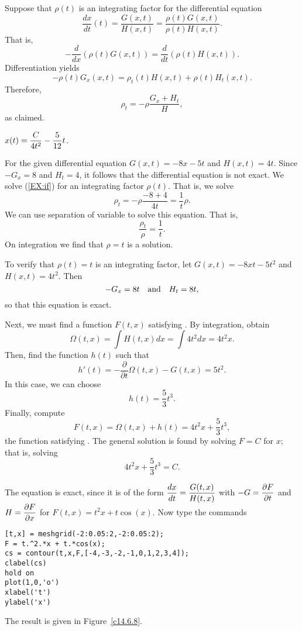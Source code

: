 \documentclass{ximera}
\begin{document}
Suppose that $\rho(t)$ is an integrating factor for the differential equation
\[
\frac{dx}{dt}(t) = \frac{G(x,t)}{H(x,t)}=\frac{\rho(t)G(x,t)}{\rho(t)H(x,t)}.
\]
That is,
\[
-\frac{d}{dx}(\rho(t)G(x,t)) = \frac{d}{dt}(\rho(t)H(x,t)).
\]
Differentiation yields
\[
-\rho(t)G_x(x,t) = \rho_t(t)H(x,t) + \rho(t)H_t(x,t).
\]
Therefore,
\begin{equation} \label{EX:if}
\rho_t = -\rho\frac{G_x+H_t}{H},
\end{equation}
as claimed.

 \ans $x(t) = \displaystyle\frac{C}{4t^2} - \frac{5}{12}t$.

\soln  For the given differential equation $G(x,t)=-8x-5t$ and $H(x,t)=4t$. 
Since $-G_x=8$ and $H_t=4$, it follows that the differential equation is not
exact.  We solve (\ref{EX:if}) for an integrating factor $\rho(t)$.  That is,
we solve
\[
\rho_t = -\rho\frac{-8+4}{4t} = \frac{1}{t}\rho.
\]
We can use separation of variable to solve this equation.  That is,
\[
\frac{\rho_t}{\rho} =  \frac{1}{t}.
\]
On integration we find that $\rho=t$ is a solution.

To verify that $\rho(t)=t$ is an integrating factor, let $G(x,t)=-8xt-5t^2$
and $H(x,t)=4t^2$.  Then 
\[
-G_x = 8t \quad\mbox{and}\quad H_t = 8t,
\]
so that this equation is exact.

Next, we must find a function $F(t,x)$ satisfying .  By
integration, obtain
\[
\Omega(t,x) = \int H(t,x)dx = \int 4t^2dx = 4t^2x.
\]
Then, find the function $h(t)$ such that
\[
h'(t) = -\frac{\partial}{\partial t}\Omega(t,x) - G(t,x) = 5t^2.
\]
In this case, we can choose 
\[
h(t) =  \frac{5}{3}t^3.  
\]
Finally, compute
\[
F(t,x) = \Omega(t,x) + h(t) = 4t^2x + \frac{5}{3}t^3,
\]
the function satisfying .  The general solution is found by 
solving $F=C$ for $x$; that is, solving
\[
4t^2x + \frac{5}{3}t^3 = C.
\]

  The equation is exact, since it is of the form
$\displaystyle\frac{dx}{dt} = \frac{G(t,x)}{H(t,x)}$ with
$-G=\displaystyle\frac{\partial F}{\partial t}$ and
$H=\displaystyle\frac{\partial F}{\partial x}$ for $F(t,x) = t^2 x + t\cos(x)$.
Now type the commands
\begin{verbatim}
[t,x] = meshgrid(-2:0.05:2,-2:0.05:2);
F = t.^2.*x + t.*cos(x);
cs = contour(t,x,F,[-4,-3,-2,-1,0,1,2,3,4]);
clabel(cs)
hold on
plot(1,0,'o')
xlabel('t')
ylabel('x')
\end{verbatim}
The result is given in Figure~\ref{c14.6.8}.
\begin{figure}[htb]
     \centerline{%
     }
\end{figure} 
\end{document}
